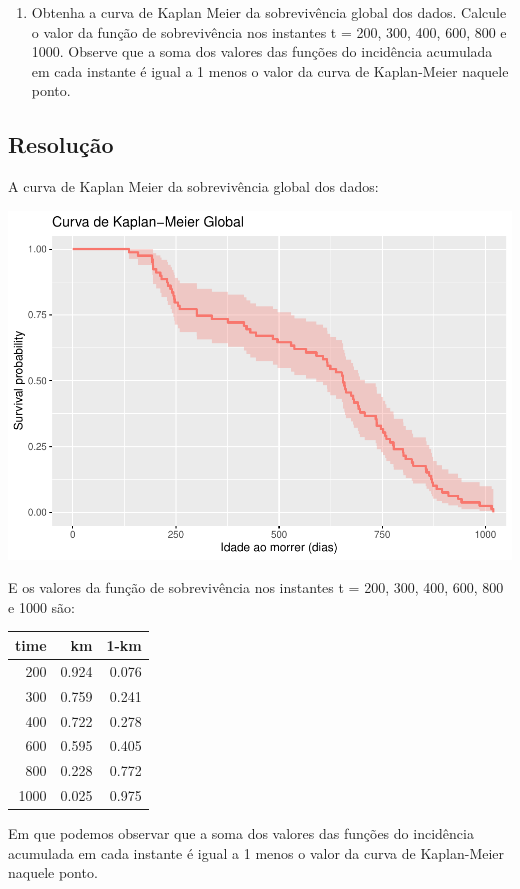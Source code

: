 \documentclass[]{article}
\providecommand{\tightlist}{%
  \setlength{\itemsep}{0pt}\setlength{\parskip}{0pt}}
\begin{document}
\begin{enumerate}
\def\labelenumi{(\alph{enumi})}
\setcounter{enumi}{2}
\tightlist
\item
  Obtenha a curva de Kaplan Meier da sobrevivência global dos dados.
  Calcule o valor da função de sobrevivência nos instantes t = 200, 300,
  400, 600, 800 e 1000. Observe que a soma dos valores das funções do
  incidência acumulada em cada instante é igual a 1 menos o valor da
  curva de Kaplan-Meier naquele ponto.
\end{enumerate}

\subsection{Resolução}\label{resolucao-8}

A curva de Kaplan Meier da sobrevivência global dos dados:

\begin{center}\includegraphics[width=0.8\linewidth]{Lista_5_files/figure-latex/unnamed-chunk-20-1} \end{center}

E os valores da função de sobrevivência nos instantes t = 200, 300, 400,
600, 800 e 1000 são:

\begin{longtable}[]{@{}rrr@{}}
\toprule
time & km & 1-km\tabularnewline
\midrule
\endhead
200 & 0.924 & 0.076\tabularnewline
300 & 0.759 & 0.241\tabularnewline
400 & 0.722 & 0.278\tabularnewline
600 & 0.595 & 0.405\tabularnewline
800 & 0.228 & 0.772\tabularnewline
1000 & 0.025 & 0.975\tabularnewline
\bottomrule
\end{longtable}

Em que podemos observar que a soma dos valores das funções do incidência
acumulada em cada instante é igual a 1 menos o valor da curva de
Kaplan-Meier naquele ponto.
\end{document}
